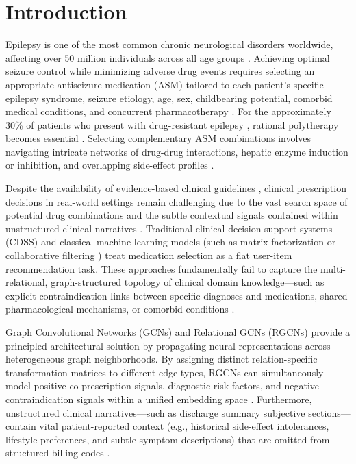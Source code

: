 \documentclass[11pt,a4paper]{article}
\begin{document}
\clearpage

\section{Introduction}

Epilepsy is one of the most common chronic neurological disorders worldwide, affecting over 50 million individuals across all age groups \cite{who2024epilepsy, beghi2019treatment}. Achieving optimal seizure control while minimizing adverse drug events requires selecting an appropriate antiseizure medication (ASM) tailored to each patient's specific epilepsy syndrome, seizure etiology, age, sex, childbearing potential, comorbid medical conditions, and concurrent pharmacotherapy \cite{glauser2013ilae, kwan2000early, french2004efficacy}. For the approximately 30\% of patients who present with drug-resistant epilepsy \cite{kwan2010definition, perruca2021polytherapy}, rational polytherapy becomes essential \cite{marson2021sanad}. Selecting complementary ASM combinations involves navigating intricate networks of drug-drug interactions, hepatic enzyme induction or inhibition, and overlapping side-effect profiles \cite{perruca2006pharmacological, brodie2013antiseizure}.

Despite the availability of evidence-based clinical guidelines \cite{glauser2013ilae, ilae2025classification, fisher2017operational}, clinical prescription decisions in real-world settings remain challenging due to the vast search space of potential drug combinations and the subtle contextual signals contained within unstructured clinical narratives \cite{johnson2024mimic, wang2018clinical}. Traditional clinical decision support systems (CDSS) and classical machine learning models (such as matrix factorization or collaborative filtering \cite{koren2009matrix}) treat medication selection as a flat user-item recommendation task. These approaches fundamentally fail to capture the multi-relational, graph-structured topology of clinical domain knowledge---such as explicit contraindication links between specific diagnoses and medications, shared pharmacological mechanisms, or comorbid conditions \cite{shang2019gamenet, yang2021safedrug, shang2019prenet}.

Graph Convolutional Networks (GCNs) \cite{kipf2017semi, velickovic2018graph} and Relational GCNs (RGCNs) \cite{schlichtkrull2018modeling, wu2020comprehensive} provide a principled architectural solution by propagating neural representations across heterogeneous graph neighborhoods. By assigning distinct relation-specific transformation matrices to different edge types, RGCNs can simultaneously model positive co-prescription signals, diagnostic risk factors, and negative contraindication signals within a unified embedding space \cite{yang2021micron, yang2023molerec, chen2021gcn}. Furthermore, unstructured clinical narratives---such as discharge summary subjective sections---contain vital patient-reported context (e.g., historical side-effect intolerances, lifestyle preferences, and subtle symptom descriptions) that are omitted from structured billing codes \cite{lee2020biobert, devlin2019bert, alsentzer2019publicly}.
\end{document}
